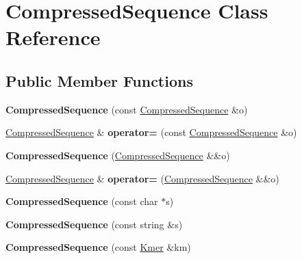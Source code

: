 \hypertarget{classCompressedSequence}{}\section{Compressed\+Sequence Class Reference}
\label{classCompressedSequence}
\subsection*{Public Member Functions}
\begin{DoxyCompactItemize}
\item 
\mbox{\label{classCompressedSequence_abb7105433e78676641927001eb89d240}} 
{\bfseries Compressed\+Sequence} (const \hyperlink{classCompressedSequence}{Compressed\+Sequence} \&o)
\item 
\mbox{\label{classCompressedSequence_a5b7be26a9b096a566b0fea156e78c653}} 
\hyperlink{classCompressedSequence}{Compressed\+Sequence} \& {\bfseries operator=} (const \hyperlink{classCompressedSequence}{Compressed\+Sequence} \&o)
\item 
\mbox{\label{classCompressedSequence_af6313899fcd39cfd1d40ee3d7bfc73a9}} 
{\bfseries Compressed\+Sequence} (\hyperlink{classCompressedSequence}{Compressed\+Sequence} \&\&o)
\item 
\mbox{\label{classCompressedSequence_a82633e57a2a1eecda9b84f75c27f61ca}} 
\hyperlink{classCompressedSequence}{Compressed\+Sequence} \& {\bfseries operator=} (\hyperlink{classCompressedSequence}{Compressed\+Sequence} \&\&o)
\item 
\mbox{\label{classCompressedSequence_acdf2958731e990847e51b3cc21373fb1}} 
{\bfseries Compressed\+Sequence} (const char $\ast$s)
\item 
\mbox{\label{classCompressedSequence_a600618735a32901f9ebc0304884340ed}} 
{\bfseries Compressed\+Sequence} (const string \&s)
\item 
\mbox{\label{classCompressedSequence_a5816bb2279e70797e807fc0113d0ac04}} 
{\bfseries Compressed\+Sequence} (const \hyperlink{classKmer}{Kmer} \&km)

\end{DoxyCompactItemize}
